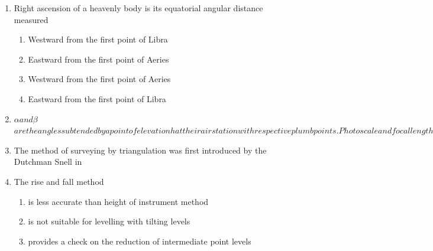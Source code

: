 \documentclass[11pt,a4paper]{article}
\begin{document}
\begin{enumerate}
\item{Right ascension of a heavenly body is its equatorial angular distance measured}
\begin{enumerate}[label=\Alph*.]
\item{Westward from the first point of Libra}
\item{Eastward from the first point of Aeries}
\item{Westward from the first point of Aeries}
\item{Eastward from the first point of Libra}
\end{enumerate}
\item{$ \alpha $$ and $$\beta $$ are the angles subtended by a point of elevation h at their air station with respective plumb points. Photo scale and focal length of the lens being ‘S’ and ‘f’ respectively. Parallax displacement of the point due to relief, i $}
\\
\item{The method of surveying by triangulation was first introduced by the Dutchman Snell in}
\\
\item{The rise and fall method}
\begin{enumerate}[label=\Alph*.]
\item{is less accurate than height of instrument method}
\item{is not suitable for levelling with tilting levels}
\item{provides a check on the reduction of intermediate point levels}

\end{enumerate}
\end{enumerate}
\end{document}
